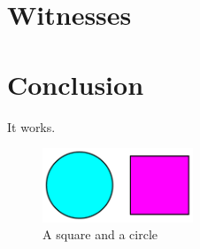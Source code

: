 

\section{Witnesses} %





\section{Conclusion} %

It works.

\begin{figure}
  \centering
  \includegraphics[width=0.4\textwidth]{fig/square-circle}
  \caption{A square and a circle}
  \label{fig:square-circle}
\end{figure} 


%
%
%
%
%
%

%



